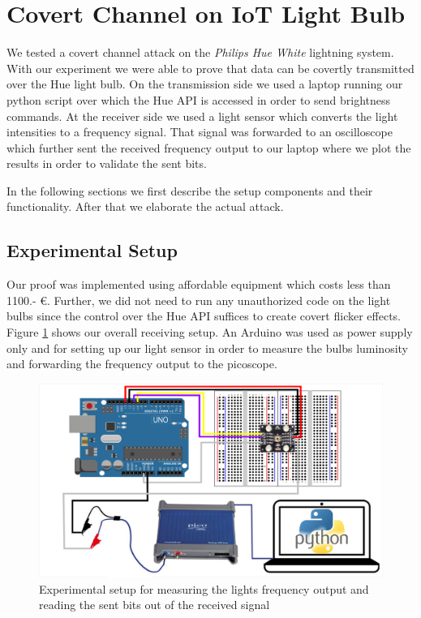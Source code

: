 \section{Covert Channel on IoT Light Bulb} %
\label{sec:experiment}

We tested a covert channel attack on the \textit{Philips Hue White} lightning system. With our experiment we were able to prove that data can be covertly transmitted over the Hue light bulb. 
On the transmission side we used a laptop running our python script over which the Hue API is accessed in order to send brightness commands.
At the receiver side we used a light sensor which converts the light intensities to a frequency signal. That signal was forwarded to an oscilloscope which further sent the received frequency output to our laptop where we plot the results in order to validate the sent bits.

In the following sections we first describe the setup components and their functionality. After that we elaborate the actual attack.\newline

\subsection{Experimental Setup} %
\label{sec:setup}


Our proof was implemented using affordable equipment which costs less than 1100.- €. Further, we did not need to run any unauthorized code on the light bulbs since the control over the Hue API suffices to create covert flicker effects. 
Figure \ref{fig:setup} shows our overall receiving setup. An Arduino was used as power supply only and for setting up our light sensor in order to measure the bulbs luminosity and forwarding the frequency output to the picoscope.

\begin{figure}[h]
	\centering
	\includegraphics[width=14cm]{img/experimental-setup_overview.png}
	\caption{Experimental setup for measuring the lights frequency output and reading the sent bits out of the received signal}
	\label{fig:setup}
\end{figure}

